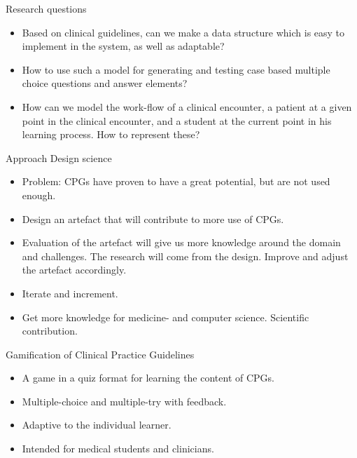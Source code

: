 \documentclass{beamer}
\begin{document}
\begin{frame}{Research questions}
\begin{itemize}
		\item Based on clinical guidelines, can we make a data structure which is easy to implement in the system, as well as adaptable? 
	
			\item How to use such a model for generating and testing case based multiple choice questions and answer elements?
			
	
	\item How can we model the work-flow of a clinical encounter, a patient at a given point in the clinical encounter, and a student at the current point in his learning process. How to represent these?	
\end{itemize}
\end{frame}


\begin{frame}{Approach}
Design science
\begin{itemize}
	\item Problem: CPGs have proven to have a great potential, but are not used enough.
	\item Design an artefact that will contribute to more use of CPGs.
	\item Evaluation of the artefact will give us more knowledge around the domain and challenges. The research will come from the design. Improve and adjust the artefact accordingly. 
	\item Iterate and increment.
	\item Get more knowledge for medicine- and computer science. Scientific contribution.
\end{itemize}
\end{frame}

\begin{frame}{Gamification of Clinical Practice Guidelines}
\begin{itemize}
	\item A game in a quiz format for learning the content of CPGs.
	\item Multiple-choice and multiple-try with feedback.
	\item Adaptive to the individual learner.
	\item Intended for medical students and clinicians.
\end{itemize}
\end{frame}
\end{document}
